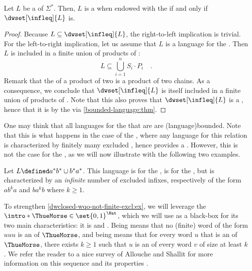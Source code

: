 \begin{corollary}
    \label{bounded-wqo-dwclosed:cor}
    Let $L$ be a  of $\Sigma^*$. Then,
    $L$ is a  when endowed with the
     if and only if $\dwset[\infleq]{L}$ is.
\end{corollary}
\begin{proof}
    Because $L \subseteq \dwset[\infleq]{L}$, the right-to-left implication
    is trivial.
    For the left-to-right implication, let us assume that $L$ is a
     language for the .
    Then $L$ is included in a finite union 
    of products of :
    \begin{equation*}
        L \subseteq \bigcup_{i = 1}^n S_i \cdot P_i \quad .
    \end{equation*}
    Remark that the  of a product of two 
    is a product of two chains.
    As a consequence, we conclude that $\dwset[\infleq]{L}$ is itself included
    in a finite union of products of .
    Note that this also proves that $\dwset[\infleq]{L}$ is a ,
    hence that it is  by the  
    via
    \cref{bounded-language:thm}.
\end{proof}


One may think that all  languages for the  that are  are \kl(language){bounded}. Note
that this is what happens in the case of the , where any
 language for this relation is characterized by finitely
many excluded , hence provides a . However, this
is not the case for the , as we will now illustrate with the
following two examples.

\begin{example}
    \label{dwclosed-wqo-not-finite-excl:ex}
    Let $L \defined a^* b^* \cup b^* a^*$. This language is  for the , is  for the
    , but is characterized by an \emph{infinite} number 
    of excluded infixes, respectively of the form $ab^ka$ and $ba^kb$ where $k \geq 1$.
\end{example}

To strengthen \cref{dwclosed-wqo-not-finite-excl:ex}, we will
leverage the  $\intro*\ThueMorse \in
\set{0,1}^{\Nat}$, which we will use as a black-box for its two main
characteristics: it is  and . Being
 means that no (finite) word of the form $uuu$ is an
 of $\ThueMorse$, and being  means that
for every word $u$ that is an  of $\ThueMorse$, there exists $k \geq
1$ such that $u$ is an  of every word $v$ of size at least $k$. We
refer the reader to a nice survey of Allouche and Shallit for more information
on this sequence and its properties \cite{ALSHA99}.

